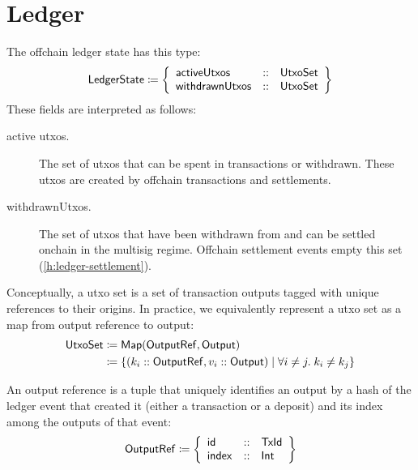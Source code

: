 \documentclass[../hydrozoa.tex]{subfiles}
\begin{document}
\section{Ledger}%
\label{h:offchain-ledger}

The offchain ledger state has this type:
\begin{equation*}
  \mathsf{LedgerState} \coloneq \left\{
  \begin{array}{lll}
    \mathsf{activeUtxos} &::& \mathsf{UtxoSet} \\
    \mathsf{withdrawnUtxos} &::& \mathsf{UtxoSet}
  \end{array}\right\}
\end{equation*}
These fields are interpreted as follows:
\begin{description}
  \item[active utxos.] The set of utxos that can be spent in transactions or withdrawn.
    These utxos are created by offchain transactions and settlements.
  \item[withdrawnUtxos.] The set of utxos that have been withdrawn from  and can be settled onchain in the multisig regime.
    Offchain settlement events empty this set (\cref{h:ledger-settlement}).
    
\end{description}

Conceptually, a utxo set is a set of transaction outputs tagged with unique references to their origins.
In practice, we equivalently represent a utxo set as a map from output reference to output:
\begin{equation*}
\begin{split}
  \mathsf{UtxoSet} &\coloneq \mathsf{Map(OutputRef, Output)} \\
    &\coloneq \left\{
      (k_i :: \mathsf{OutputRef}, v_i :: \mathsf{Output})
      \;\middle|\;
      \forall i \neq j.\; k_i \neq k_j
    \right\}
\end{split}
\end{equation*}

An output reference is a tuple that uniquely identifies an output by a hash of the ledger event that created it (either a transaction or a deposit) and its index among the outputs of that event:
\begin{equation*}
    \mathsf{OutputRef} \coloneq \left\{
    \begin{array}{lll}
      \mathsf{id} &::& \mathsf{TxId} \\
        \mathsf{index} &::& \mathsf{Int}
    \end{array} \right\}
\end{equation*}
\end{document}
